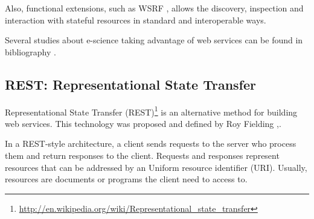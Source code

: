 \documentclass[final,1p,times]{elsarticle}
\begin{document}
Also, functional extensions, such as WSRF \cite{WSRF}, allows the discovery, inspection and interaction with stateful resources in standard and interoperable ways.

Several studies about e-science taking advantage of web services can be found in bibliography \cite{Taverna,davidson,Kepler,Perera}.


\subsection{REST: Representational State Transfer}
\label{sec:REST}

Representational State Transfer (REST)\footnote{\url{http://en.wikipedia.org/wiki/Representational_state_transfer}} is an alternative method for building web services.
This technology was proposed and defined by Roy Fielding \cite{Fielding2000},\cite{Fielding2002}.




In a REST-style architecture, a client sends requests to the server who process them and return responses to the client.
Requests and responses represent resources that can be addressed by an Uniform resource identifier (URI). Usually, resources are documents or programs the client need to access to.


\end{document}
